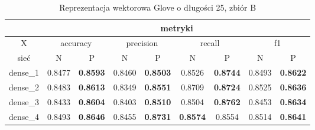 \begin{table}[h] \centering
    \caption{Reprezentacja wektorowa Glove o długości 25, zbiór B}
    \label{tab:wyniki_glove_B}
    \begin{tabular} {|c|c|c|c|c|c|c|c|c| }    \hline
                 & \multicolumn{8}{c|}{metryki}                                                                                                                                                                                                                                                                             \\ \hline
        X        & \multicolumn{2}{c|}{accuracy}       & \multicolumn{2}{c|}{precision}      & \multicolumn{2}{c|}{recall}         & \multicolumn{2}{c|}{f1}                                                                                                                                                                \\ \hline
        sieć     & N                                   & P                                   & N                                   & P                              & N                                   & P                                   & N                                   & P                                   \\ \hline
        dense\_1 & 0.8477                              & \textbf{0.8593}                     & 0.8460                              & \textbf{0.8503}                & 0.8526                              & \textbf{0.8744}                     & 0.8493                              & \textbf{0.8622}                     \\ \hline
        dense\_2 & 0.8483                              & \textbf{0.8613}                     & 0.8349                              & \textbf{0.8551}                & 0.8709                              & \textbf{0.8724}                     & 0.8525                              & \textbf{0.8636}                     \\ \hline
        dense\_3 & 0.8433                              & \textbf{0.8604}                     & 0.8403                              & \textbf{0.8510}                & 0.8504                              & \textbf{0.8762}                     & 0.8453                              & \textbf{0.8634}                     \\ \hline
        dense\_4 & 0.8493                              & \textbf{0.8646}                     & 0.8455                              & \textbf{0.8731}                & \textbf{0.8574}                     & 0.8554                              & 0.8514                              & \textbf{0.8641}                     \\ \hline

\end{tabular}
\end{table}
